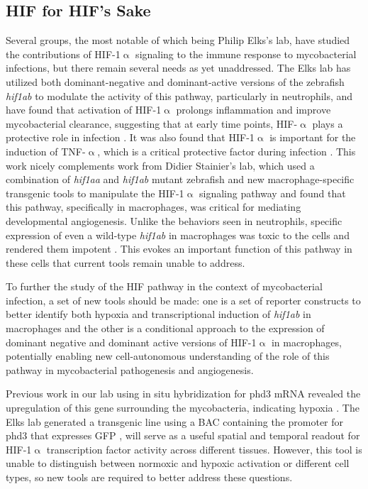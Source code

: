 \subsection{HIF for HIF's Sake}

Several groups, the most notable of which being Philip Elks's lab, have studied the contributions of HIF-1$\upalpha$ signaling to the immune response to mycobacterial infections, but there remain several needs as yet unaddressed. The Elks lab has utilized both dominant-negative and dominant-active versions of the zebrafish \textit{hif1ab} to modulate the activity of this pathway, particularly in neutrophils, and have found that activation of HIF-1$\upalpha$ prolongs inflammation and improve mycobacterial clearance, suggesting that at early time points, HIF-$\upalpha$ plays a protective role in infection \citep{Elks2011, Elks2013}. It was also found that HIF-1$\upalpha$ is important for the induction of TNF-$\upalpha$, which is a critical protective factor during infection \citep{Lewis2019, Flynn1995}. This work nicely complements work from Didier Stainier's lab, which used a combination of \textit{hif1aa} and \textit{hif1ab} mutant zebrafish and new macrophage-specific transgenic tools to manipulate the HIF-1$\upalpha$ signaling pathway and found that this pathway, specifically in macrophages, was critical for mediating developmental angiogenesis. Unlike the behaviors seen in neutrophils, specific expression of even a wild-type \textit{hif1ab} in macrophages was toxic to the cells and rendered them impotent \citep{Gerri2017}. This evokes an important function of this pathway in these cells that current tools remain unable to address. 

To further the study of the HIF pathway in the context of mycobacterial infection, a set of new tools should be made: one is a set of reporter constructs to better identify both hypoxia and transcriptional induction of \textit{hif1ab} in macrophages and the other is a conditional approach to the expression of dominant negative and dominant active versions of HIF-1$\upalpha$ in macrophages, potentially enabling new cell-autonomous understanding of the role of this pathway in mycobacterial pathogenesis and angiogenesis.

Previous work in our lab using in situ hybridization for phd3 mRNA revealed the upregulation of this gene surrounding the mycobacteria, indicating hypoxia \citep{Oehlers2015}. The Elks lab generated a transgenic line using a BAC containing the promoter for phd3 that expresses GFP \citep{Santhakuma2012}, will serve as a useful spatial and temporal readout for HIF-1$\upalpha$ transcription factor activity across different tissues. However, this tool is unable to distinguish between normoxic and hypoxic activation or different cell types, so new tools are required to better address these questions.

